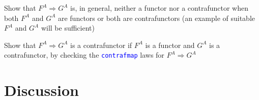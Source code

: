 Show that $F^{A}\Rightarrow G^{A}$ is, in general, neither a functor
nor a contrafunctor when both $F^{A}$ and $G^{A}$ are functors or
both are contrafunctors (an example of suitable $F^{A}$ and $G^{A}$
will be sufficient)

Show that $F^{A}\Rightarrow G^{A}$ is a contrafunctor if $F^{A}$
is a functor and $G^{A}$ is a contrafunctor, by checking the \texttt{\textcolor{blue}{\footnotesize{}contrafmap}}
laws for $F^{A}\Rightarrow G^{A}$ 


\section{Discussion}

\begin{comment}
this is chapter four all about functors functors are an abstraction
that captures the features of what it means to have container like
types were container like data bunkers are always type constructors
so they're parametrized by type and they mean a container that has
items of values of that type first example would be a sequence so
that is obviously visualized as a container that has zero or more
items of type T so sequence of T written like this but there are other
containers like for example future of T they're very different from
sequence how do we formulate this idea that something is a container
some type constructor and represents a container when they're so different
so sequence is one or more values of this type so you can take one
you can find which one is in the sequence or how many and so on and
here's another one which represents a value of type T that will be
available later or actually may fail to be become available but it's
not available now in any case likely so how do we abstract away a
common feature between these two very different data types it turns
out that the common feature is what I call here the bare functionality
of a container it's just the functionality that describes the idea
of holding in some way an item or perhaps several items of type T
and holding means you can manipulate this data inside the container
that's the only way that we can interpret this if there is data inside
the container but we can never manipulate it in any way then that's
not reasonable to call that a container so what does it mean to manipulate
it means we can apply functions to these values because in functional
programming that's all we do we apply functions and get new values
out of old ones so the idea that the container holds items it means
that we can apply a function to these items and the new items will

\end{comment}
